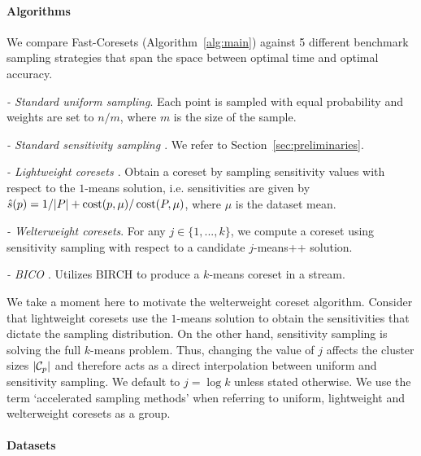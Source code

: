 \paragraph*{Algorithms}
\label{ssec:algorithms}

We compare Fast-Coresets (Algorithm~\ref{alg:main}) against 5 different benchmark sampling strategies that span the space between optimal time and optimal
accuracy.
\begin{description}
        \item \emph{- Standard uniform sampling}. Each point is sampled with equal probability and weights are set to $n / m$, where $m$ is the size of the sample.
        \item \emph{- Standard sensitivity sampling \cite{LS10}}. We refer to Section~\ref{sec:preliminaries}.
        \item \emph{- Lightweight coresets \cite{bachem2018scalable}}. Obtain a coreset by sampling sensitivity values with respect to the $1$-means solution,
            i.e. sensitivities are given by $\hat{s}(p) = 1/|P| + \operatorname{cost}(p, \mu) / \operatorname{cost}(P, \mu)$, where $\mu$ is the dataset mean.
        \item \emph{- Welterweight coresets}. For any $j \in \{1,..., k\}$, we compute a coreset using sensitivity sampling with respect to a candidate
            $j$-means++ solution.
        \item \emph{- BICO \cite{bico}}. Utilizes BIRCH \cite{birch} to produce a $k$-means coreset in a stream.
\end{description}



We take a moment here to motivate the welterweight coreset algorithm.  Consider that lightweight coresets use the $1$-means solution to obtain the sensitivities
that dictate the sampling distribution. On the other hand, sensitivity sampling is solving the full $k$-means problem. Thus, changing the value of $j$ affects
the cluster sizes $|\mathcal C_p|$ and therefore acts as a direct interpolation between uniform and sensitivity sampling.  We default to $j = \log k$ unless stated
otherwise. We use the term `accelerated sampling methods' when referring to uniform, lightweight and welterweight coresets as a group.


\paragraph*{Datasets}
\label{sssec:datasets}

